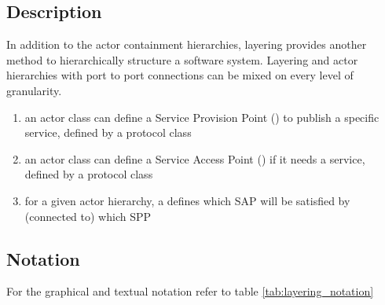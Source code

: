 \subsection{Description}

In addition to the actor containment hierarchies, layering provides another method to hierarchically 
structure a software system. Layering and actor hierarchies with port to port connections can be mixed on 
every level of granularity.

\begin{enumerate}
\item an actor class can define a Service Provision Point () to publish a specific service, defined by a 
protocol class
\item an actor class can define a Service Access Point () if it needs a service, defined by a 
protocol class
\item for a given actor hierarchy, a  defines which SAP will be satisfied by (connected to) 
which SPP
\end{enumerate}

\subsection{Notation}

For the graphical and textual notation refer to table \ref{tab:layering_notation}


